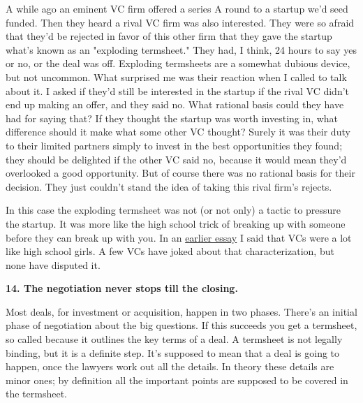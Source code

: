A while ago an
                  eminent VC firm offered a series A round to a startup we'd
                  seed funded. Then they heard a rival VC firm was also
                  interested. They were so afraid that they'd be rejected in
                  favor of this other firm that they gave the startup what's
                  known as an "exploding termsheet." They had, I think, 24 hours
                  to say yes or no, or the deal was off. Exploding termsheets
                  are a somewhat dubious device, but not uncommon. What
                  surprised me was their reaction when I called to talk about
                  it. I asked if they'd still be interested in the startup if
                  the rival VC didn't end up making an offer, and they said no.
                  What rational basis could they have had for saying that? If
                  they thought the startup was worth investing in, what
                  difference should it make what some other VC thought? Surely
                  it was their duty to their limited partners simply to invest
                  in the best opportunities they found; they should be delighted
                  if the other VC said no, because it would mean they'd
                  overlooked a good opportunity. But of course there was no
                  rational basis for their decision. They just couldn't stand
                  the idea of taking this rival firm's rejects.

In
                  this case the exploding termsheet was not (or not only) a
                  tactic to pressure the startup. It was more like the high
                  school trick of breaking up with someone before they can break
                  up with you. In an
                  \href{http://www.paulgraham.com/startupfunding.html}{earlier essay} I said that
                  VCs were a lot like high school girls. A few VCs have joked
                  about that characterization, but none have disputed it.

\textbf{14. The negotiation never stops till the closing.}

Most deals, for investment or acquisition, happen
                  in two phases. There's an initial phase of negotiation about
                  the big questions. If this succeeds you get a termsheet, so
                  called because it outlines the key terms of a deal. A
                  termsheet is not legally binding, but it is a definite step.
                  It's supposed to mean that a deal is going to happen, once the
                  lawyers work out all the details. In theory these details are
                  minor ones; by definition all the important points are
                  supposed to be covered in the termsheet.

